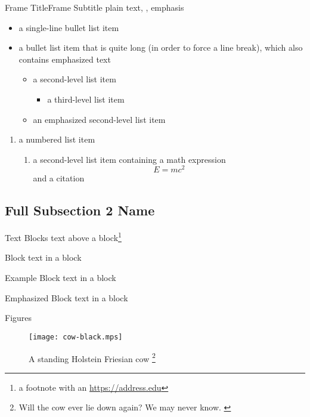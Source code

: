 \documentclass[
]{beamer}
\begin{document}
	\begin{frame}{Frame Title}{Frame Subtitle}
		plain text, , \alert{emphasis}
		\begin{itemize}
			\item a single-line bullet list item
			\item a bullet list item that is quite long (in order to force a line break),
			which also contains \alert{emphasized text}
			\begin{itemize}
				\item a second-level list item
				\begin{itemize}
					\item a third-level list item
				\end{itemize}
				\item \alert{an emphasized second-level list item}
			\end{itemize}
		\end{itemize}
		\begin{enumerate}
			\item a numbered list item
			\begin{enumerate}
				\item a second-level list item containing a math expression
				\[ E = mc^2 \]
				and a citation \cite{einstein1905tragheit}
			\end{enumerate}
		\end{enumerate}
	\end{frame}
	
	\subsection[Short Subsection 2 Name]{Full Subsection 2 Name}
	
	\begin{frame}{Text Blocks}
		text above a block\footnote{a footnote with an \url{https://address.edu}}
		\begin{block}{Block}
			text in a block
		\end{block}
		\begin{exampleblock}{Example Block}
			text in a block
		\end{exampleblock}
		\begin{alertblock}{Emphasized Block}
			text in a block
		\end{alertblock}
	\end{frame}
	
	\begin{frame}{Figures}
		\begin{figure}
			\texttt{[image: cow-black.mps]}
			\caption{A standing Holstein Friesian cow%
				\footnote{%
					Will the cow ever lie down again?
					We may never know.
					\cite{tolkamp10cows}
				}%
			}
		\end{figure}
	\end{frame}
	
\end{document}
